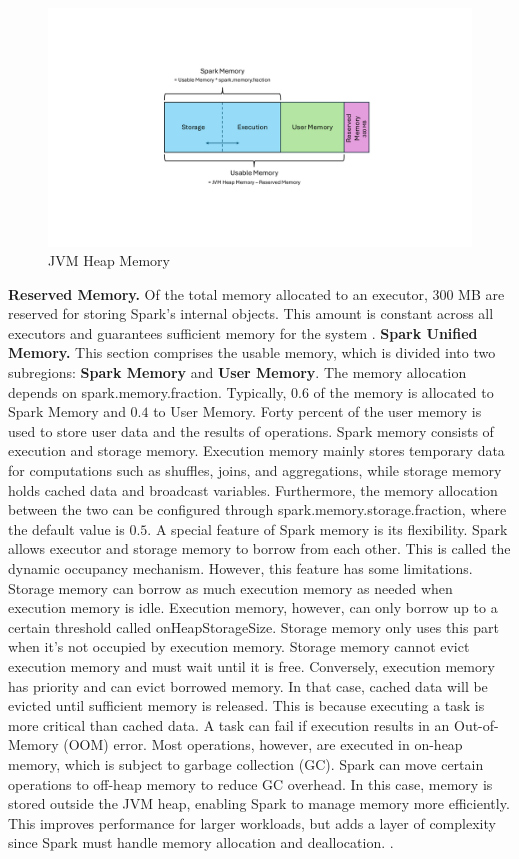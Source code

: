\begin{figure}[ht]
    \centering
    \includegraphics[width=0.7\linewidth]{images/Spark_mem_man.pdf}
    \caption{JVM Heap Memory}
    \label{fig:spark-mem-man}
\end{figure}

\textbf{Reserved Memory.} Of the total memory allocated to an executor, 300 MB are reserved for storing Spark's internal objects. This amount is constant across all executors and guarantees sufficient memory for the system \cite{apache_spark_configuration_2025}.
\textbf{Spark Unified Memory.} This section comprises the usable memory, which is divided into two subregions: \textbf{Spark Memory} and \textbf{User Memory}. The memory allocation depends on spark.memory.fraction. Typically, $0.6$ of the memory is allocated to Spark Memory and $0.4$ to User Memory. Forty percent of the user memory is used to store user data and the results of operations. Spark memory consists of execution and storage memory. Execution memory mainly stores temporary data for computations such as shuffles, joins, and aggregations, while storage memory holds cached data and broadcast variables. Furthermore, the memory allocation between the two can be configured through spark.memory.storage.fraction, where the default value is $0.5$. A special feature of Spark memory is its flexibility. Spark allows executor and storage memory to borrow from each other. This is called the dynamic occupancy mechanism. However, this feature has some limitations. Storage memory can borrow as much execution memory as needed when execution memory is idle. Execution memory, however, can only borrow up to a certain threshold called onHeapStorageSize. Storage memory only uses this part when it's not occupied by execution memory. Storage memory cannot evict execution memory and must wait until it is free. Conversely, execution memory has priority and can evict borrowed memory. In that case, cached data will be evicted until sufficient memory is released. This is because executing a task is more critical than cached data. A task can fail if execution results in an Out-of-Memory (OOM) error. Most operations, however, are executed in on-heap memory, which is subject to garbage collection (GC). Spark can move certain operations to off-heap memory to reduce GC overhead. In this case, memory is stored outside the JVM heap, enabling Spark to manage memory more efficiently. This improves performance for larger workloads, but adds a layer of complexity since Spark must handle memory allocation and deallocation. \cite{chambers_spark_2018}\cite{apache_spark_tuning_2025}. 

